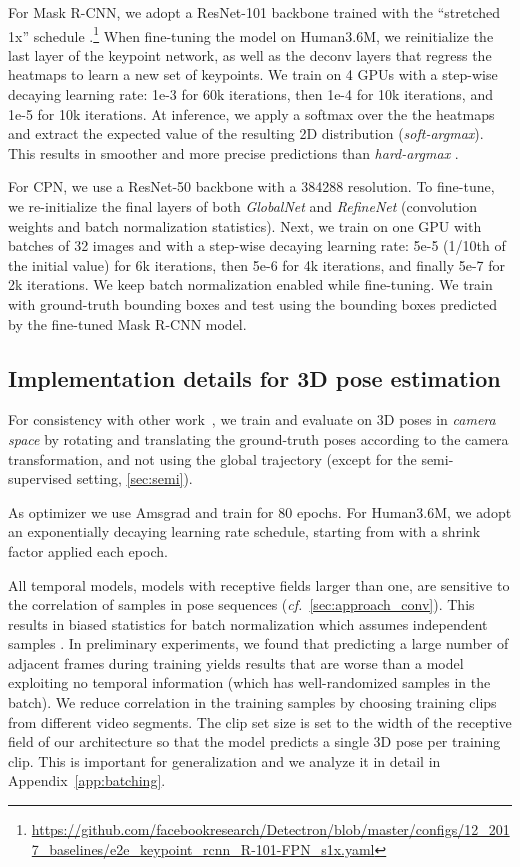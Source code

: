 \documentclass[10pt,twocolumn,letterpaper]{article}
\begin{document}
For Mask R-CNN, we adopt a ResNet-101 backbone trained with the ``stretched 1x'' schedule \cite{he:mask:2017}.\footnote{ \url{https://github.com/facebookresearch/Detectron/blob/master/configs/12_2017_baselines/e2e_keypoint_rcnn_R-101-FPN_s1x.yaml}}
When fine-tuning the model on Human3.6M, we reinitialize the last layer of the keypoint network, as well as the {deconv} layers that regress the heatmaps to learn a new set of keypoints. 
We train on 4 GPUs with a step-wise decaying learning rate: 1e-3 for 60k iterations, then 1e-4 for 10k iterations, and 1e-5 for 10k iterations. 
At inference, we apply a softmax over the the heatmaps and extract the expected value of the resulting 2D distribution (\emph{soft-argmax}).
This results in smoother and more precise predictions than \emph{hard-argmax} \cite{luvizon:2d:2018}. 

For CPN, we use a ResNet-50 backbone with a 384288 resolution. 
To fine-tune, we re-initialize the final layers of both \emph{GlobalNet} and \emph{RefineNet} (convolution weights and batch normalization statistics). 
Next, we train on one GPU with batches of 32 images and with a step-wise decaying learning rate: 5e-5 (1/10th of the initial value) for 6k iterations, then 5e-6 for 4k iterations, and finally 5e-7 for 2k iterations. 
We keep batch normalization enabled while fine-tuning. 
We train with ground-truth bounding boxes and test using the bounding boxes predicted by the fine-tuned Mask R-CNN model.


\subsection{Implementation details for 3D pose estimation}
For consistency with other work~\cite{martinez:simple:2017, li:maximum:2015, tekin:direct:2016, zhou:sparseness:2016, martinez:simple:2017, pavlakos:coarse:2017}, we train and evaluate on 3D poses in \emph{camera space} by rotating and translating the ground-truth poses according to the camera transformation, and not using the global trajectory (except for the semi-supervised setting, \textsection\ref{sec:semi}).

As optimizer we use Amsgrad \cite{reddi:amsgrad:2018} and train for 80 epochs.
For Human3.6M, we adopt an exponentially decaying learning rate schedule, starting from  with a shrink factor  applied each epoch. 

All temporal models, \ie models with receptive fields larger than one, are sensitive to the correlation of samples in pose sequences (\emph{cf.~}\textsection\ref{sec:approach_conv}). 
This results in biased statistics for batch normalization which assumes independent samples \cite{ioffe:batch:2015}.
In preliminary experiments, we found that predicting a large number of adjacent frames during training yields results that are worse than a model exploiting no temporal information (which has well-randomized samples in the batch). 
We reduce correlation in the training samples by choosing training clips from different video segments. 
The clip set size is set to the width of the receptive field of our architecture so that the model predicts a single 3D pose per training clip.
This is important for generalization and we analyze it in detail in Appendix~\ref{app:batching}. 
\end{document}
